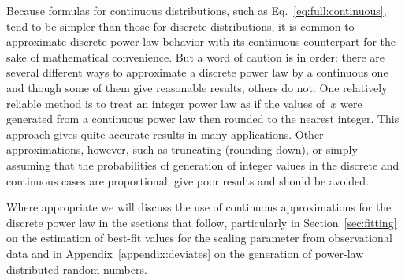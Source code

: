 \documentclass[final]{siamltex}
\begin{document}
Because formulas for continuous distributions, such as
Eq.~\eqref{eq:full:continuous}, tend to be simpler than those for discrete
distributions, it is common to approximate discrete power-law behavior with
its continuous counterpart for the sake of mathematical convenience.  But a
word of caution is in order: there are several different ways to
approximate a discrete power law by a continuous one and though some of
them give reasonable results, others do not.  One relatively reliable
method is to treat an integer power law as if the values of~$x$ were
generated from a continuous power law then rounded to the nearest integer.
This approach gives quite accurate results in many applications.  Other
approximations, however, such as truncating (rounding down), or simply
assuming that the probabilities of generation of integer values in the
discrete and continuous cases are proportional, give poor results and
should be avoided.

Where appropriate we will discuss the use of continuous approximations for
the discrete power law in the sections that follow, particularly in
Section~\ref{sec:fitting} on the estimation of best-fit values for the
scaling parameter from observational data and in
Appendix~\ref{appendix:deviates} on the generation of power-law distributed
random numbers.
\end{document}
